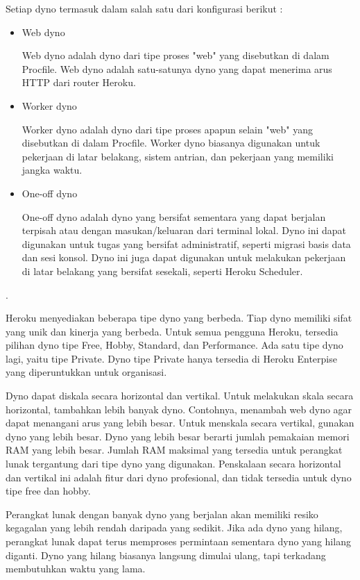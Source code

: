 Setiap dyno termasuk dalam salah satu dari konfigurasi berikut :
\begin{itemize}
\item Web dyno

Web dyno adalah dyno dari tipe proses "web" yang disebutkan di dalam Procfile. Web dyno adalah satu-satunya dyno yang dapat menerima arus HTTP dari router Heroku.

\item Worker dyno

Worker dyno adalah dyno dari tipe proses apapun selain "web" yang disebutkan di dalam Procfile. Worker dyno biasanya digunakan untuk pekerjaan di latar belakang, sistem antrian, dan pekerjaan yang memiliki jangka waktu.
\item One-off dyno

One-off dyno adalah dyno yang bersifat sementara yang dapat berjalan terpisah atau dengan masukan/keluaran dari terminal lokal. Dyno ini dapat digunakan untuk tugas yang bersifat administratif, seperti migrasi basis data dan sesi konsol. Dyno ini juga dapat digunakan untuk melakukan pekerjaan di latar belakang yang bersifat sesekali, seperti Heroku Scheduler.

\end{itemize}. 

Heroku menyediakan beberapa tipe dyno yang berbeda. Tiap dyno memiliki sifat yang unik dan kinerja yang berbeda. Untuk semua pengguna Heroku, tersedia pilihan dyno tipe Free, Hobby, Standard, dan Performance. Ada satu tipe dyno lagi, yaitu tipe Private. Dyno tipe Private hanya tersedia di Heroku Enterpise yang diperuntukkan untuk organisasi.

Dyno dapat diskala secara horizontal dan vertikal. Untuk melakukan skala secara horizontal, tambahkan lebih banyak dyno. Contohnya, menambah web dyno agar dapat menangani arus yang lebih besar. Untuk menskala secara vertikal, gunakan dyno yang lebih besar. Dyno yang lebih besar berarti jumlah pemakaian memori RAM yang lebih besar. Jumlah RAM maksimal yang tersedia untuk perangkat lunak tergantung dari tipe dyno yang digunakan. Penskalaan secara horizontal dan vertikal ini adalah fitur dari dyno profesional, dan tidak tersedia untuk dyno tipe free dan hobby.

Perangkat lunak dengan banyak dyno yang berjalan akan memiliki resiko kegagalan yang lebih rendah daripada yang sedikit. Jika ada dyno yang hilang, perangkat lunak dapat terus memproses permintaan sementara dyno yang hilang diganti. Dyno yang hilang biasanya langsung dimulai ulang, tapi terkadang membutuhkan waktu yang lama.

